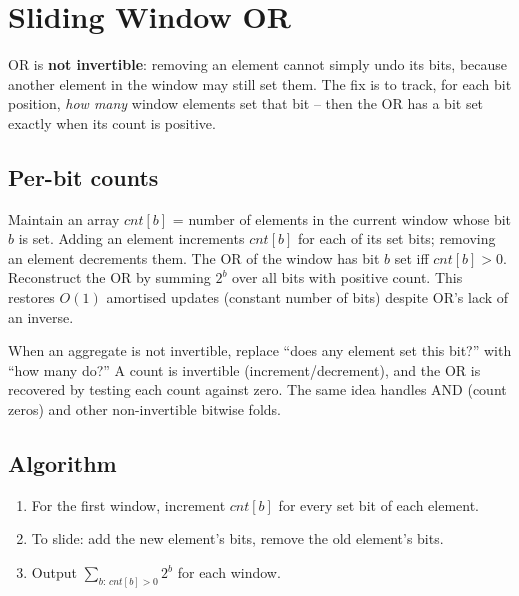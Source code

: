 \section{Sliding Window OR}
\label{sec:cses-sw-or}


\begin{patternbox}
OR is \textbf{not invertible}: removing an element cannot simply undo its
bits, because another element in the window may still set them. The fix is
to track, for each bit position, \emph{how many} window elements set that
bit -- then the OR has a bit set exactly when its count is positive.
\end{patternbox}

\subsection*{Per-bit counts}

Maintain an array $\textit{cnt}[b]$ = number of elements in the current
window whose bit $b$ is set. Adding an element increments $\textit{cnt}[b]$
for each of its set bits; removing an element decrements them. The OR of
the window has bit $b$ set iff $\textit{cnt}[b]>0$. Reconstruct the OR by
summing $2^b$ over all bits with positive count. This restores $O(1)$
amortised updates (constant number of bits) despite OR's lack of an
inverse.

\begin{ideabox}
When an aggregate is not invertible, replace ``does any element set this
bit?'' with ``how many do?'' A count is invertible (increment/decrement),
and the OR is recovered by testing each count against zero. The same idea
handles AND (count zeros) and other non-invertible bitwise folds.
\end{ideabox}

\subsection*{Algorithm}

\begin{enumerate}
  \item For the first window, increment $\textit{cnt}[b]$ for every set
        bit of each element.
  \item To slide: add the new element's bits, remove the old element's
        bits.
  \item Output $\sum_{b:\,\textit{cnt}[b]>0}2^b$ for each window.
\end{enumerate}

